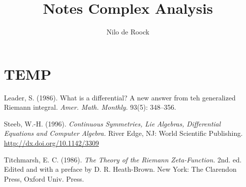 \documentclass{book}
\theoremstyle{theorem}
\theoremstyle{definition}
\begin{document}
    \title{Notes Complex Analysis}

    \author{Nilo de Roock}

    \maketitle

    \chapter{TEMP}
    



    \begin{thebibliography}{3}

        Leader, S. (1986). What is a differential? A new answer from teh generalized Riemann integral. {\it Amer. Math. Monthly.\/} 93(5): 348--356.

        Steeb, W.-H. (1996). \textit{Continuous Symmetries, Lie Algebras, Differential Equations and Computer Algebra.\/} River Edge, NJ: World Scientific Publishing.  \href{http://dx.doi.org/10.1142/3309}{\url{http://dx.doi.org/10.1142/3309}}

        Titchmarsh, E. C. (1986). {\it The Theory of the Riemann Zeta-Function.\/} 2nd. ed. Edited and with a preface by D. R. Heath-Brown. New York: The Clarendon Press, Oxford Univ. Press.

    \end{thebibliography}
\end{document}
